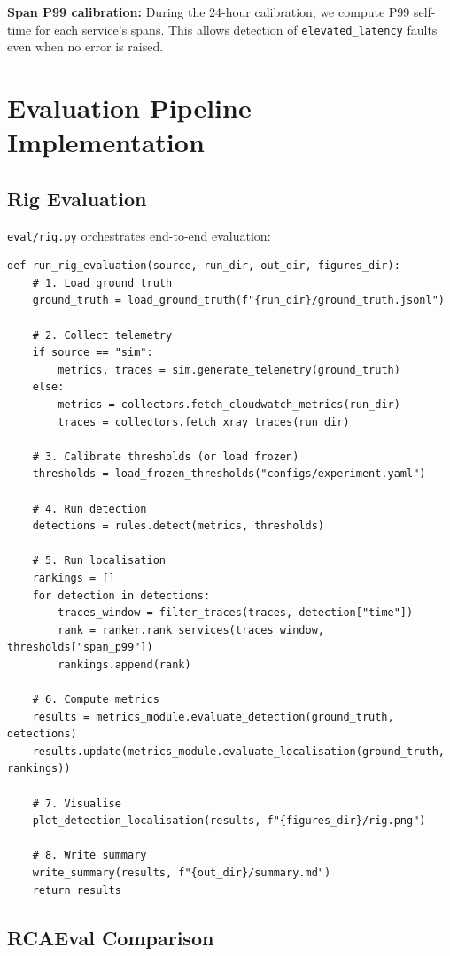 \textbf{Span P99 calibration:} During the 24-hour calibration, we compute P99 self-time for each service's spans. This allows detection of \texttt{elevated\_latency} faults even when no error is raised.

\section{Evaluation Pipeline Implementation}

\subsection{Rig Evaluation}

\texttt{eval/rig.py} orchestrates end-to-end evaluation:

\begin{verbatim}
def run_rig_evaluation(source, run_dir, out_dir, figures_dir):
    # 1. Load ground truth
    ground_truth = load_ground_truth(f"{run_dir}/ground_truth.jsonl")
    
    # 2. Collect telemetry
    if source == "sim":
        metrics, traces = sim.generate_telemetry(ground_truth)
    else:
        metrics = collectors.fetch_cloudwatch_metrics(run_dir)
        traces = collectors.fetch_xray_traces(run_dir)
    
    # 3. Calibrate thresholds (or load frozen)
    thresholds = load_frozen_thresholds("configs/experiment.yaml")
    
    # 4. Run detection
    detections = rules.detect(metrics, thresholds)
    
    # 5. Run localisation
    rankings = []
    for detection in detections:
        traces_window = filter_traces(traces, detection["time"])
        rank = ranker.rank_services(traces_window, thresholds["span_p99"])
        rankings.append(rank)
    
    # 6. Compute metrics
    results = metrics_module.evaluate_detection(ground_truth, detections)
    results.update(metrics_module.evaluate_localisation(ground_truth, rankings))
    
    # 7. Visualise
    plot_detection_localisation(results, f"{figures_dir}/rig.png")
    
    # 8. Write summary
    write_summary(results, f"{out_dir}/summary.md")
    return results
\end{verbatim}

\subsection{RCAEval Comparison}

